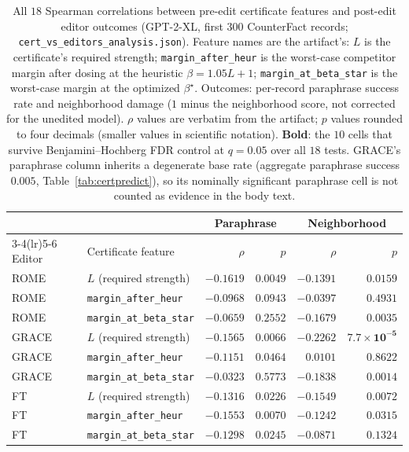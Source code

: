 \documentclass[11pt]{article}
\theoremstyle{remark}
\begin{document}
\begin{table}[t]
\centering\small
\begin{tabular}{l l r r r r}
\toprule
& & \multicolumn{2}{c}{Paraphrase} & \multicolumn{2}{c}{Neighborhood} \\
\cmidrule(lr){3-4}\cmidrule(lr){5-6}
Editor & Certificate feature & $\rho$ & $p$ & $\rho$ & $p$ \\
\midrule
ROME  & $L$ (required strength) & $\mathbf{-0.1619}$ & $\mathbf{0.0049}$ & $\mathbf{-0.1391}$ & $\mathbf{0.0159}$ \\
ROME  & \texttt{margin\_after\_heur} & $-0.0968$ & $0.0943$ & $-0.0397$ & $0.4931$ \\
ROME  & \texttt{margin\_at\_beta\_star} & $-0.0659$ & $0.2552$ & $\mathbf{-0.1679}$ & $\mathbf{0.0035}$ \\
\addlinespace
GRACE & $L$ (required strength) & $\mathbf{-0.1565}$ & $\mathbf{0.0066}$ & $\mathbf{-0.2262}$ & $\mathbf{7.7\times10^{-5}}$ \\
GRACE & \texttt{margin\_after\_heur} & $-0.1151$ & $0.0464$ & $0.0101$ & $0.8622$ \\
GRACE & \texttt{margin\_at\_beta\_star} & $-0.0323$ & $0.5773$ & $\mathbf{-0.1838}$ & $\mathbf{0.0014}$ \\
\addlinespace
FT    & $L$ (required strength) & $\mathbf{-0.1316}$ & $\mathbf{0.0226}$ & $\mathbf{-0.1549}$ & $\mathbf{0.0072}$ \\
FT    & \texttt{margin\_after\_heur} & $\mathbf{-0.1553}$ & $\mathbf{0.0070}$ & $-0.1242$ & $0.0315$ \\
FT    & \texttt{margin\_at\_beta\_star} & $\mathbf{-0.1298}$ & $\mathbf{0.0245}$ & $-0.0871$ & $0.1324$ \\
\bottomrule
\end{tabular}
\caption{All $18$ Spearman correlations between pre-edit certificate features
and post-edit editor outcomes (GPT-2-XL, first $300$ CounterFact records;
\texttt{cert\_vs\_editors\_analysis.json}). Feature names are the artifact's:
$L$ is the certificate's required strength;
\texttt{margin\_after\_heur} is the worst-case competitor margin after dosing
at the heuristic $\beta=1.05L+1$; \texttt{margin\_at\_beta\_star} is the
worst-case margin at the optimized $\beta^{\star}$. Outcomes: per-record
paraphrase success rate and neighborhood damage ($1$ minus the neighborhood
score, not corrected for the unedited model). $\rho$ values are
verbatim from the artifact; $p$ values rounded to four decimals (smaller
values in scientific notation).
\textbf{Bold}: the $10$ cells that survive Benjamini--Hochberg FDR control at
$q=0.05$ over all $18$ tests. GRACE's paraphrase column inherits a degenerate
base rate (aggregate paraphrase success $0.005$,
Table~\ref{tab:certpredict}), so its nominally significant paraphrase cell is
not counted as evidence in the body text.}
\label{tab:certpredict18}
\end{table}
\end{document}
